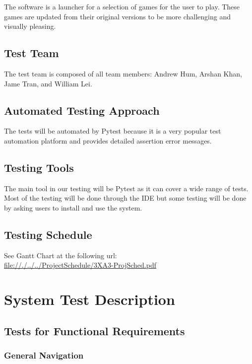 \documentclass[12pt, titlepage]{article}
\begin{document}
The software is a launcher for a selection of games for the user to play. These games are updated from their original versions to be more challenging and visually pleasing.

\subsection{Test Team}

The test team is composed of all team members: Andrew Hum, Arshan Khan, Jame Tran, and William Lei.

\subsection{Automated Testing Approach}

The tests will be automated by Pytest because it is a very popular test automation platform and provides detailed assertion error messages.

\subsection{Testing Tools}
The main tool in our testing will be Pytest as it can cover a wide range of tests. Most of the testing will be done through the IDE but some testing will be done by asking users to install and use the system.

\subsection{Testing Schedule}
		
See Gantt Chart at the following url: \\
\url{file://./../../ProjectSchedule/3XA3-ProjSched.pdf} 

\section{System Test Description}
	
\subsection{Tests for Functional Requirements}

\subsubsection{General Navigation}
\end{document}
